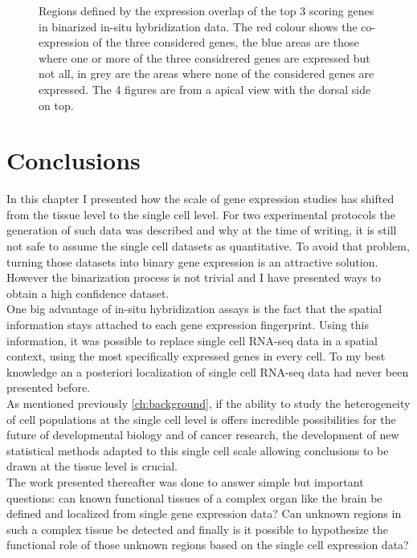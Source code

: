 \begin{figure}[h]
        \caption{Regions defined by the expression overlap of the top 3 scoring genes in \cite{Tomer10} binarized in-situ hybridization data. The red colour shows the co-expression of the three considered genes, the blue areas are those where one or more of the three considrered genes are expressed but not all, in grey are the areas where none of the considered genes are expressed. The 4 figures are from a apical view with the dorsal side on top.}\label{fig:cell_localization}
\end{figure}


\section{Conclusions}
In this chapter I presented how the scale of gene expression studies has shifted from the tissue level to the single cell level. For two experimental protocols the generation of such data was described and why at the time of writing, it is still not safe to assume the single cell datasets as quantitative. To avoid that problem, turning those datasets into binary gene expression is an attractive solution. However the binarization process is not trivial and I have presented ways to obtain a high confidence dataset.\\

One big advantage of in-situ hybridization assays is the fact that the spatial information stays attached to each gene expression fingerprint. Using this information, it was possible to replace single cell RNA-seq data in a spatial context, using the most specifically expressed genes in every cell. To my best knowledge an a posteriori localization of single cell RNA-seq data had never been presented before.\\

As mentioned previously \ref{ch:background}, if the ability to study the heterogeneity of cell populations at the single cell level is offers incredible possibilities for the future of developmental biology and of cancer research, the development of new statistical methods adapted to this single cell scale allowing conclusions to be drawn at the tissue level is crucial.\\

The work presented thereafter was done to answer simple but important questions: can known functional tissues of a complex organ like the brain be defined and localized from single gene expression data? Can unknown regions in such a complex tissue be detected and finally is it possible to hypothesize the functional role of those unknown regions based on the single cell expression data?


	
	




